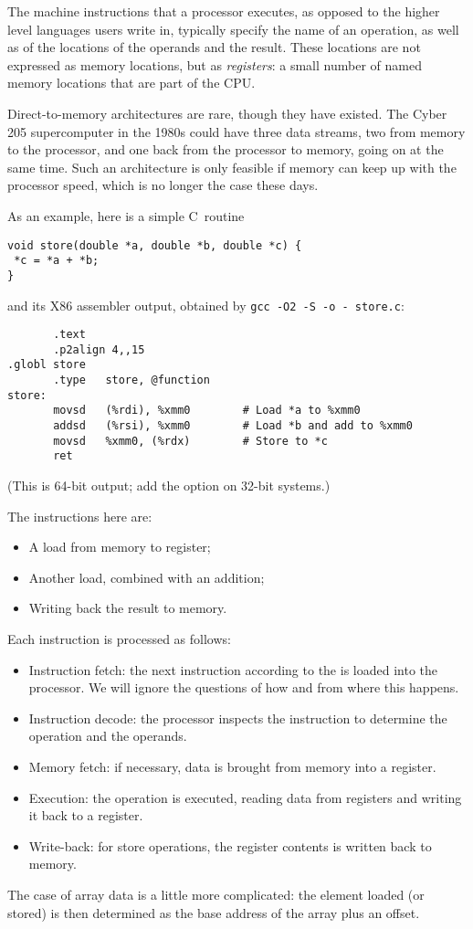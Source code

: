 The machine instructions that a processor executes, as opposed to the
higher level languages users write in, typically specify the name of
an operation, as well as of the locations of the operands and the
result. These locations are not expressed as memory locations, but as
\emph{registers}: a small number of named memory locations that
are part of the \ac{CPU}.
\begin{remark}
Direct-to-memory architectures are rare,
  though they have existed. The Cyber 205 supercomputer in the 1980s
  could have three data streams, two from memory to the processor, and one
  back from the processor to memory, going on at the same time. Such
  an architecture is only feasible if memory can keep up with the
  processor speed, which is no longer the case these days.
\end{remark}
As an
example, here is a simple C~routine
\begin{verbatim}
void store(double *a, double *b, double *c) {
 *c = *a + *b;
}
\end{verbatim}
and its X86 assembler output, obtained by
\verb+gcc -O2 -S -o - store.c+:
\begin{verbatim}
       .text
       .p2align 4,,15
.globl store
       .type   store, @function
store:
       movsd   (%rdi), %xmm0		# Load *a to %xmm0
       addsd   (%rsi), %xmm0		# Load *b and add to %xmm0
       movsd   %xmm0, (%rdx)		# Store to *c
       ret
\end{verbatim}
(This is 64-bit
    output; add the option  on 32-bit systems.)

The instructions here are:
\begin{itemize}
\item A load from memory to register;
\item Another load, combined with an addition;
\item Writing back the result to memory.
\end{itemize}
Each instruction is processed as follows:
\begin{itemize}
\item Instruction fetch: the next instruction according to the
   is loaded into the processor. We will
  ignore the questions of how and from where this happens.
\item Instruction decode: the processor inspects the instruction to
  determine the operation and the operands.
\item Memory fetch: if necessary, data is brought from memory
    into a register.
\item Execution: the operation is executed, reading data from registers
  and writing it back to a register.
\item Write-back: for store operations, the register contents is
  written back to memory.
\end{itemize}
The case of array data is a little more complicated: the element
loaded (or stored) is then determined as the base address of the array
plus an offset.


